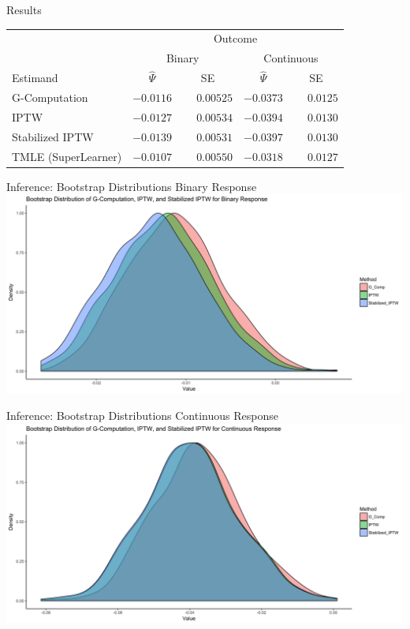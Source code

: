 \documentclass[english]{beamer}
\begin{document}
\begin{frame}{Results}
\begin{center}
\begin{tabular}{lcccc}
\toprule
 & \multicolumn{4}{c}{Outcome} \\ \cmidrule(lr){2-5}
 & \multicolumn{2}{c}{Binary} & \multicolumn{2}{c}{Continuous} \\ \cmidrule(lr){2-3}\cmidrule(lr){4-5}
Estimand  & $\hat{\Psi}$ & SE & $\hat{\Psi}$ & \multicolumn{1}{c}{SE} \\ 
\midrule
G-Computation  & $-0.0116$ & $\phantom{-}0.00525$ & $-0.0373$ & $\phantom{-}0.0125$ \\
IPTW  & $-0.0127$ & $\phantom{-}0.00534$ & $-0.0394$ & $\phantom{-}0.0130$ \\
Stabilized IPTW  & $-0.0139$ & $\phantom{-}0.00531$ & $-0.0397$ & $\phantom{-}0.0130$ \\
TMLE (SuperLearner)  & $-0.0107$ & $\phantom{-}0.00550$ & $-0.0318$ & $\phantom{-}0.0127$
\bottomrule 
\end{tabular}
\end{center}
\end{frame}

\begin{frame}{Inference: Bootstrap Distributions Binary Response}
\includegraphics[scale=.095]{figures/boot_dens_binary.png}
\end{frame}

\begin{frame}{Inference: Bootstrap Distributions Continuous Response}
\includegraphics[scale=.095]{figures/boot_dens_continuous.png}
\end{frame}
\end{document}
